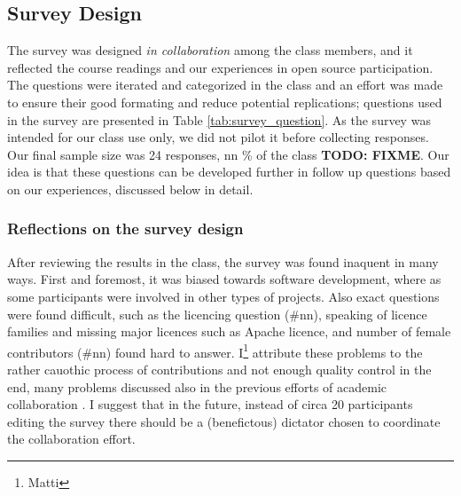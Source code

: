 \subsection{Survey Design}

The survey was designed {\it in collaboration} among the class members, and it reflected the course readings and our experiences in open source participation. The questions were iterated and categorized in the class and an effort was made to ensure their good formating and reduce potential replications; questions used in the survey are presented in Table \ref{tab:survey_question}. As the survey was intended for our class use only, we did not pilot it before collecting responses. Our final sample size was 24 responses, nn \% of the class \textbf{TODO: FIXME}. Our idea is that these questions can be developed further in follow up questions based on our experiences, discussed below in detail.

\subsubsection{Reflections on the survey design}

After reviewing the results in the class, the survey was found inaquent in many ways. First and foremost, it was biased towards software development, where as some participants were involved in other types of projects. Also exact questions were found difficult, such as the licencing question (\#nn), speaking of licence families and missing major licences such as Apache licence, and number of female contributors (\#nn) found hard to answer. I\footnote{Matti} attribute these problems to the rather cauothic process of contributions and not enough quality control in the end, many problems discussed also in the previous efforts of academic collaboration \cite{Tomlinson2012}. I suggest that in the future, instead of circa 20 participants editing the survey there should be a (benefictous) dictator chosen to coordinate the collaboration effort.


